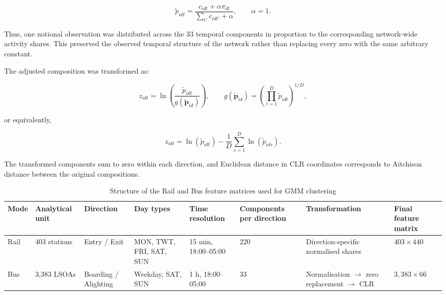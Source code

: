 \begin{equation}
\widetilde{p}_{idt} = \frac{c_{idt} + \alpha \pi_{dt}}{\sum_{t'} c_{idt'} + \alpha}, \qquad \alpha = 1.
\end{equation}

Thus, one notional observation was distributed across the 33 temporal components in proportion to the corresponding network-wide activity shares. This preserved the observed temporal structure of the network rather than replacing every zero with the same arbitrary constant.

The adjusted composition was transformed as:

\begin{equation}
z_{idt} = \ln\!\left( \frac{\widetilde{p}_{idt}}{g(\widetilde{\mathbf{p}}_{id})} \right), \qquad g(\widetilde{\mathbf{p}}_{id}) = \left( \prod_{t=1}^{D} \widetilde{p}_{idt} \right)^{1/D},
\end{equation}

or equivalently,

\begin{equation}
z_{idt} = \ln(\widetilde{p}_{idt}) - \frac{1}{D} \sum_{s=1}^{D} \ln(\widetilde{p}_{ids}).
\end{equation}

The transformed components sum to zero within each direction, and Euclidean distance in CLR coordinates corresponds to Aitchison distance between the original compositions.

\begin{landscape}
\vspace*{\fill}
\begin{table}[H]
\centering
\small
\setlength{\tabcolsep}{4pt}
\renewcommand{\arraystretch}{1.15}
\begin{tabular}{@{}p{1.2cm} p{2.2cm} p{2.1cm} p{3.0cm} p{2.8cm} p{2.2cm} p{5.0cm} p{2.4cm}@{}}
\toprule
Mode & Analytical unit & Direction & Day types & Time resolution & Components per direction & Transformation & Final feature matrix \\
\midrule
Rail & 403 stations & Entry / Exit & MON, TWT, FRI, SAT, SUN & 15 min, 18:00--05:00 & 220 & Direction-specific normalised shares & $403 \times 440$ \\
Bus & 3,383 LSOAs & Boarding / Alighting & Weekday, SAT, SUN & 1 h, 18:00--05:00 & 33 & Normalisation $\rightarrow$ zero replacement $\rightarrow$ CLR & $3{,}383 \times 66$ \\
\bottomrule
\end{tabular}
\caption[Rail and Bus feature matrices]{Structure of the Rail and Bus feature matrices used for GMM clustering}
\end{table}
\vspace*{\fill}
\end{landscape}


